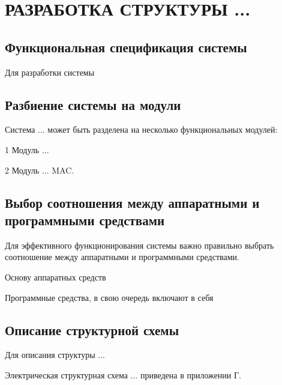 \chapter[Разработка структуры ...]
{РАЗРАБОТКА СТРУКТУРЫ ...}

\section{Функциональная спецификация системы}\par
\hspace*{12.5 mm}Для разработки системы 

\section{Разбиение системы на модули}\par
\hspace*{12.5 mm}Система ...  может быть разделена на несколько функциональных 
модулей:

  1 Модуль ... 

  2 Модуль ... MAC.\@
  
\section{Выбор соотношения между аппаратными и программными средствами}\par
\hspace*{12.5 mm}Для эффективного функционирования системы важно правильно 
выбрать соотношение между аппаратными и программными средствами.

Основу аппаратных средств 

Программные средства, в свою очередь включают в себя 

\section{Описание структурной схемы}\par
\hspace*{12.5 mm}Для описания структуры ...

Электрическая структурная схема ... 
приведена в приложении Г.